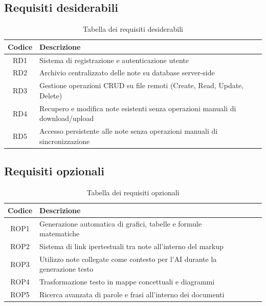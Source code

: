 \documentclass[11pt,a4paper]{article}
\begin{document}
\subsection{Requisiti desiderabili}
\begin{table}[H]
    \centering
    \begin{tabular}{|c|>{\raggedright\arraybackslash}p{}|c|c|}
        \hline
        \textbf{Codice} & \textbf{Descrizione} \\
        \hline
        RD1 & Sistema di registrazione e autenticazione utente \\
        \hline
        RD2 & Archivio centralizzato delle note su database server-side \\
        \hline
        RD3 & Gestione operazioni CRUD su file remoti (Create, Read, Update, Delete) \\
        \hline
        RD4 & Recupero e modifica note esistenti senza operazioni manuali di download/upload \\
        \hline
        RD5 & Accesso persistente alle note senza operazioni manuali di sincronizzazione \\
        \hline
        
    \end{tabular}
    \caption{Tabella dei requisiti desiderabili}
\end{table}

\subsection{Requisiti opzionali}
\begin{table}[H]
    \centering
    \begin{tabular}{|c|>{\raggedright\arraybackslash}p{}|c|c|}
        \hline
        \textbf{Codice} & \textbf{Descrizione} \\
        \hline
        ROP1 & Generazione automatica di grafici, tabelle e formule matematiche \\
        \hline
        ROP2 & Sistema di link ipertestuali tra note all'interno del markup \\
        \hline
        ROP3 & Utilizzo note collegate come contesto per l'AI durante la generazione testo \\
        \hline
        ROP4 & Trasformazione testo in mappe concettuali e diagrammi \\
        \hline
        ROP5 & Ricerca avanzata di parole e frasi all'interno dei documenti \\
        \hline
        
    \end{tabular}
    \caption{Tabella dei requisiti opzionali}
\end{table}
\end{document}
